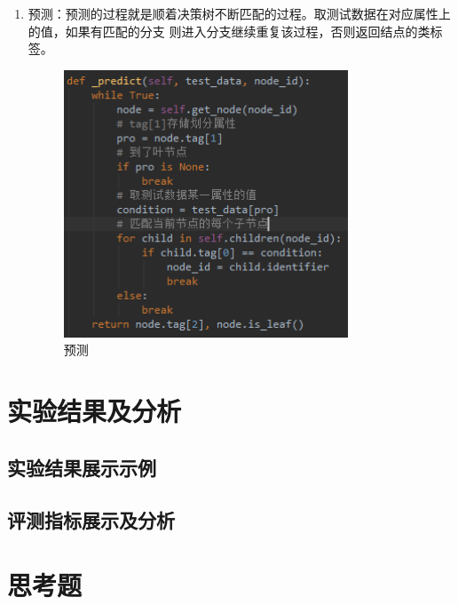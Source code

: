 \documentclass[UTF8,a4paper,12pt]{article}
\begin{document}
\begin{enumerate}[itemindent=0.5em,label=\arabic*、]
\begin{figure}[h]
  \end{figure}
  \item 预测：预测的过程就是顺着决策树不断匹配的过程。取测试数据在对应属性上的值，如果有匹配的分支
  则进入分支继续重复该过程，否则返回结点的类标签。
  \begin{figure}[h]
  \begin{center}
  \includegraphics[width=0.8\textwidth]{p6.png} %
  \caption{预测}
  \end{center}
  \end{figure}
\end{enumerate}

\section{实验结果及分析}
\subsection{实验结果展示示例}
\subsection{评测指标展示及分析}

\section{思考题}
\end{document}
